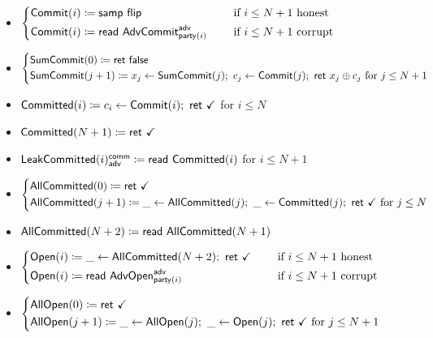 \begin{itemize}
\item {\color{blue} $\begin{cases*} \Commit(i) \coloneqq \samp{\flip} & \hspace{10pt} \text{if $i \leq N+1$ honest} \\ \Commit(i) \coloneqq \read{\AdvCommit^\adv_{\party(i)}} & \hspace{10pt} \text{if $i \leq N+1$ corrupt} \end{cases*}$}
\item {\color{blue} $\begin{cases*} \SumCommit(0) \coloneqq \ret{\false} \\ \SumCommit(j+1) \coloneqq x_j \leftarrow \SumCommit(j); \ c_j \leftarrow \Commit(j); \ \ret{x_j \oplus c_j} \text{ for $j \leq N+1$} \end{cases*}$}
\item {\color{magenta} $\mathsf{Committed}(i) \coloneqq c_i \leftarrow \mathsf{Commit}(i); \ \mathsf{ret} \ \checkmark$ for $i \leq N$}
\item {\color{magenta} $\mathsf{Committed}(N+1) \coloneqq \mathsf{ret} \ \checkmark$}
\item {\color{magenta} $\mathsf{LeakCommitted}(i)^{\mathsf{comm}}_{\mathsf{adv}} \coloneqq \mathsf{read} \ \mathsf{Committed}(i)$ for $i \leq N+1$}
\item {\color{magenta} $\begin{cases*} \AllCommitted(0) \coloneqq \ret{\checkmark} \\ \AllCommitted(j+1) \coloneqq \_ \leftarrow \AllCommitted(j); \ \_ \leftarrow \Committed(j); \ \ret{\checkmark} \text{ for $j \leq N$} \end{cases*}$}
\item {\color{magenta} $\mathsf{AllCommitted}(N+2) \coloneqq \mathsf{read} \ \mathsf{AllCommitted}(N+1)$}
\item {\color{teal} $\begin{cases*} \Open(i) \coloneqq \_ \leftarrow \AllCommitted(N+2); \ \ret{\checkmark} & \hspace{10pt} \text{if $i \leq N+1$ honest} \\ \Open(i) \coloneqq \read{\AdvOpen^\adv_{\party(i)}} & \hspace{10pt} \text{if $i \leq N+1$ corrupt} \end{cases*}$}
\item {\color{teal} $\begin{cases*} \AllOpen(0) \coloneqq \ret{\checkmark} \\ \AllOpen(j+1) \coloneqq \_ \leftarrow \AllOpen(j); \ \_ \leftarrow \Open(j); \ \ret{\checkmark} \text{ for $j \leq N+1$} \end{cases*}$}

\end{itemize}
